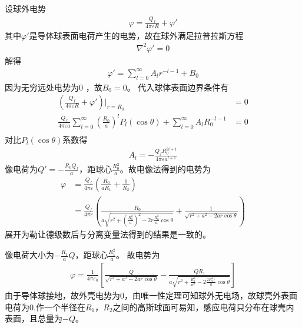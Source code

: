 \documentclass{phyasgn}
\begin{document}
\begin{sol}[1]
  设球外电势
  \begin{align*}
    \varphi=\frac{Q_f}{4\pi\varepsilon R}+\varphi'
  \end{align*}
  其中$\varphi'$是导体球表面电荷产生的电势，故在球外满足拉普拉斯方程
  \begin{align*}
    \nabla^2\varphi'=0
  \end{align*}  
  解得
  \begin{align*}
    \varphi'=\sum_{l=0}^{\infty}A_lr^{-l-1}+B_0
  \end{align*}
  因为无穷远处电势为0
  ，故$B_0=0$。
  代入球体表面边界条件有
  \begin{align*}
    (\frac{Q_f}{4\pi\varepsilon R}+\varphi')|_{r=R_0}&=0\\
    \frac{Q_f}{4\pi\varepsilon a}\sum_{l=0}^{\infty}(\frac{R_0}{a})^lP_l(\cos\theta)+\sum_{l=0}^{\infty}A_lR_0^{-l-1}&=0\\
  \end{align*}
  对比$P_l(\cos\theta)$系数得
  \begin{align*}
    A_l=-\frac{Q_fR_0^{2l+1}}{4\pi\varepsilon a^{l+1}}
  \end{align*}
  像电荷为$Q'=-\frac{R_0Q_f}{a}$，距球心$\frac{R_0^2}{a}$。故电像法得到的电势为
  \begin{align*}
    \varphi&=\frac{Q_f}{4\pi\varepsilon}(\frac{R_0}{aR_1}+\frac{1}{R_2})\\
    &=\frac{Q_f}{4\pi\varepsilon}(\frac{R_0}{a\sqrt{r^2+(\frac{R_0^2}{a})^2-2r\frac{R_0^2}{a}\cos\theta}}+\frac{1}{\sqrt{r^2+a^2-2ar\cos\theta}})
  \end{align*}
  展开为勒让德级数后与分离变量法得到的结果是一致的。
\end{sol}

\begin{sol}[2]
  像电荷大小为$-\frac{R_1}{a}Q$，距球心$\frac{R_1^2}{a}$。
  故电势为
  \begin{align*}
    \varphi=\frac{1}{4\pi\varepsilon_0}\left[\frac{Q}{\sqrt{r^2+a^2-2ar\cos\theta}}-\frac{QR_1}{a\sqrt{r^2+\frac{R_1^4}{a^2}-2\frac{2R_1^2r}{a}\cos\theta}}\right]
  \end{align*}
  由于导体球接地，故外壳电势为0，由唯一性定理可知球外无电场，故球壳外表面电荷为0.作一个半径在$R_1$，$R_2$之间的高斯球面可易知，感应电荷只分布在球壳内表面，且总量为$-Q$。
\end{sol}
\end{document}
